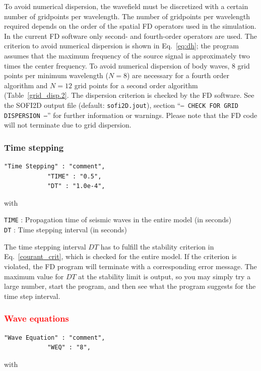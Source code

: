 To avoid numerical dispersion, the wavefield must be discretized with a certain number of gridpoints per wavelength. The number of gridpoints per wavelength required depends on the order of the spatial FD operators used in the simulation. In the current FD software only second- and fourth-order operators are used. The criterion to avoid numerical dispersion is shown in Eq.~\ref{eq:dh}; the program assumes that the maximum frequency of the source signal is approximately two times the center frequency. To avoid numerical dispersion of body waves, 8 grid points per minimum wavelength ($N=8$) are necessary for a fourth order algorithm and $N=12$ grid points for a second order algorithm (Table~\ref{grid_disp.2}. The dispersion criterion is checked by the FD software. See the SOFI2D output file (default: \texttt{sofi2D.jout}), section \enquote{\texttt{--- CHECK FOR GRID DISPERSION ---}} for further information or warnings. Please note that the FD code will not terminate due to grid dispersion.

\subsubsection{Time stepping}
\begin{verbatim}
"Time Stepping" : "comment",
			"TIME" : "0.5",
			"DT" : "1.0e-4",
\end{verbatim}

with

\texttt{TIME} : Propagation time of seismic waves in the entire model (in seconds)\\
\texttt{DT} : Time stepping interval (in seconds)

The time stepping interval $DT$ has to fulfill the stability criterion in Eq.~\ref{courant_crit}, which is checked for the entire model. If the criterion is violated, the FD program will terminate with a corresponding error message. The maximum value for $DT$ at the stability limit is output, so you may simply try a large number, start the program, and then see what the program suggests for the time step interval.

\subsubsection{\textcolor{red}{Wave equations}}
\begin{verbatim}
"Wave Equation" : "comment",
            "WEQ" : "8",
\end{verbatim}

with

